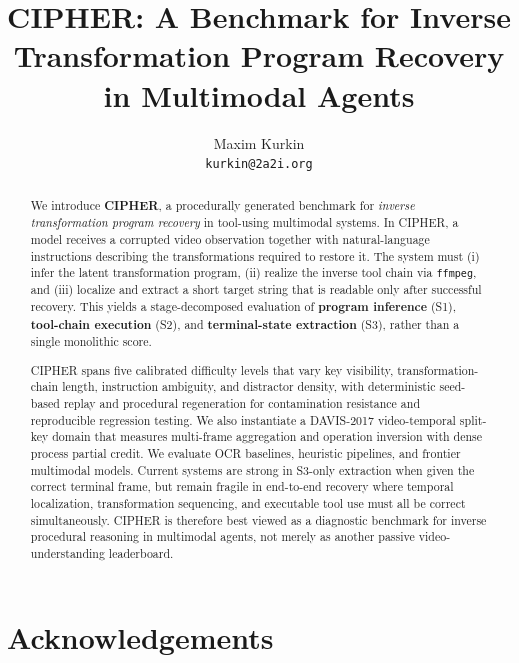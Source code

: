 \documentclass{article}
\title{CIPHER: A Benchmark for Inverse Transformation Program Recovery in Multimodal Agents}
\author{%
  Maxim Kurkin \\
  \texttt{kurkin@2a2i.org}
}
\begin{document}
\maketitle

\begin{abstract}
We introduce \textbf{CIPHER}, a procedurally generated benchmark for
\emph{inverse transformation program recovery} in tool-using multimodal
systems. In CIPHER, a model receives a corrupted video observation together
with natural-language instructions describing the transformations required to
restore it. The system must (i) infer the latent transformation program,
(ii) realize the inverse tool chain via \texttt{ffmpeg}, and
(iii) localize and extract a short target string that is readable only after
successful recovery. This yields a stage-decomposed evaluation of
\textbf{program inference} (S1), \textbf{tool-chain execution} (S2), and
\textbf{terminal-state extraction} (S3), rather than a single monolithic score.

CIPHER spans five calibrated difficulty levels that vary key visibility,
transformation-chain length, instruction ambiguity, and distractor density,
with deterministic seed-based replay and procedural regeneration for
contamination resistance and reproducible regression testing.
We also instantiate a DAVIS-2017 video-temporal split-key domain that measures
multi-frame aggregation and operation inversion with dense process partial
credit.
We evaluate OCR baselines, heuristic pipelines, and frontier multimodal models.
Current systems are strong in S3-only extraction when given the correct
terminal frame, but remain fragile in end-to-end recovery where temporal
localization, transformation sequencing, and executable tool use must all be
correct simultaneously. CIPHER is therefore best viewed as a diagnostic
benchmark for inverse procedural reasoning in multimodal agents, not merely as
another passive video-understanding leaderboard.
\end{abstract}








\section*{Acknowledgements}





\end{document}

